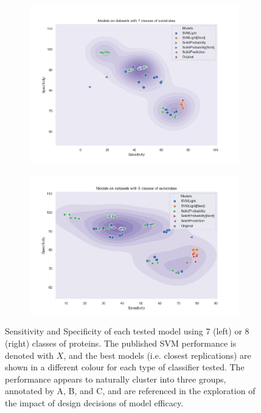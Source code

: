 \begin{figure}
  \begin{subfigure}{0.49\textwidth}
    \centering
    \includegraphics[width=\textwidth]{figures/fig71}
  \end{subfigure}
  \begin{subfigure}{0.49\textwidth}
    \centering
    \includegraphics[width=\textwidth]{figures/fig81}
  \end{subfigure}
  \caption{Sensitivity and Specificity of each tested model using 7 (left) or 8 (right) classes of proteins. The
           published SVM performance is denoted with $X$, and the best models (i.e. closest replications) are shown
           in a different colour for each type of classifier tested. The performance appears to naturally cluster into
           three groups, annotated by A, B, and C, and are referenced in the exploration of the impact of design
           decisions of model efficacy.
          }
   \label{fig:7_class_model}
\end{figure}


